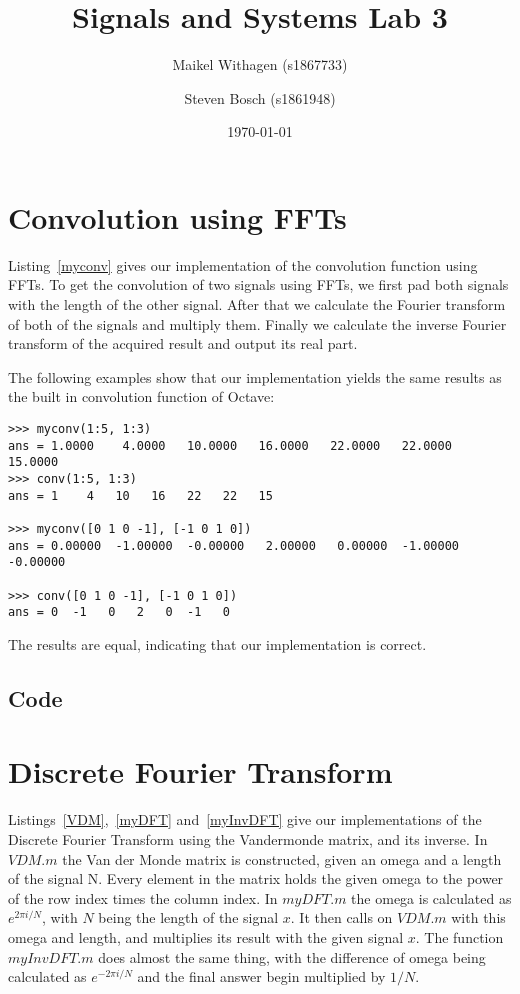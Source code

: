 \documentclass{article}
\title{Signals and Systems Lab 3}
\author{Maikel Withagen (s1867733) \and Steven Bosch (s1861948)}
\date{\today}
\begin{document}
\maketitle

\section{Convolution using FFTs}
Listing~\ref{myconv} gives our implementation of the convolution function using FFTs. To get the convolution of two signals using FFTs, we first pad both signals with the length of the other signal. After that we calculate the Fourier transform of both of the signals and multiply them. Finally we calculate the inverse Fourier transform of the acquired result and output its real part.

The following examples show that our implementation yields the same results as the built in convolution function of Octave:
\begin{lstlisting}
>>> myconv(1:5, 1:3)
ans = 1.0000    4.0000   10.0000   16.0000   22.0000   22.0000   15.0000
>>> conv(1:5, 1:3)
ans = 1    4   10   16   22   22   15

>>> myconv([0 1 0 -1], [-1 0 1 0])
ans = 0.00000  -1.00000  -0.00000   2.00000   0.00000  -1.00000  -0.00000

>>> conv([0 1 0 -1], [-1 0 1 0])
ans = 0  -1   0   2   0  -1   0
\end{lstlisting}
The results are equal, indicating that our implementation is correct.

\subsection{Code}
 

\section{Discrete Fourier Transform}
Listings~\ref{VDM},~\ref{myDFT} and~\ref{myInvDFT} give our implementations of the Discrete Fourier Transform using the Vandermonde matrix, and its inverse. In $VDM.m$ the Van der Monde matrix is constructed, given an omega and a length of the signal N. Every element in the matrix holds the given omega to the power of the row index times the column index. In $myDFT.m$ the omega is calculated as $e^{2\pi i/N}$, with $N$ being the length of the signal $x$. It then calls on $VDM.m$ with this omega and length, and multiplies its result with the given signal $x$. The function $myInvDFT.m$ does almost the same thing, with the difference of omega being calculated as $e^{-2\pi i/N}$ and the final answer begin multiplied by $1/N$.
\end{document}
